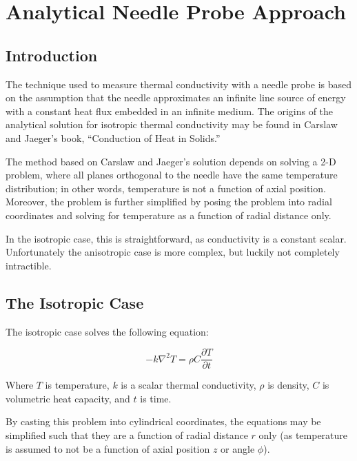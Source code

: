 \chapter{Analytical Needle Probe Approach}
\label{sec:analytical-np}
\bigskip

\section{Introduction}
\label{sec:analytical-np:intro}

The technique used to measure thermal conductivity with a needle probe is based
on the assumption that the needle approximates an infinite line source of energy
with a constant heat flux embedded in an infinite medium. The origins of the
analytical solution for isotropic thermal conductivity may be found in Carslaw
and Jaeger's book, ``Conduction of Heat in Solids.'' \cite{basictheory}

The method based on Carslaw and Jaeger's solution depends on solving a 2-D
problem, where all planes orthogonal to the needle have the same temperature
distribution; in other words, temperature is not a function of axial position.
Moreover, the problem is further simplified by posing the problem into radial
coordinates and solving for temperature as a function of radial distance only.

In the isotropic case, this is straightforward, as conductivity is a constant
scalar. Unfortunately the anisotropic case is more complex, but luckily not
completely intractible.

\section{The Isotropic Case}
\label{sec:analytical-np:isotropic}

The isotropic case solves the following equation:

\begin{equation*}
-k\nabla^2 T = \rho C\frac{\partial T}{\partial t}
\end{equation*}

Where \(T\) is temperature, \(k\) is a scalar thermal conductivity, \(\rho\) is
density, \(C\) is volumetric heat capacity, and \(t\) is time.


By casting this problem into cylindrical coordinates, the equations may be
simplified such that they are a function of radial distance \(r\) only (as
temperature is assumed to not be a function of axial position \(z\) or angle
\(\phi\)).

